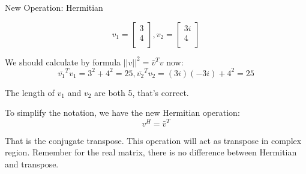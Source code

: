 \documentclass{beamer}
\begin{document}
\begin{frame}{New Operation: Hermitian}

\begin{equation*}
    v_1=\left[ \begin{array}{c}
        3\\
        4\\
    \end{array} \right] , v_2=\left[ \begin{array}{c}
        3i\\
        4\\
    \end{array} \right]
\end{equation*}

We should calculate by formula  $||v||^2=\bar{v}^Tv$ now:
\begin{equation*}
    {\bar{v_1}}^Tv_1=3^2+4^2=25, {\bar{v_2}}^Tv_2=\left( 3i \right) \left( -3i \right)+4^2=25
\end{equation*}

The length of $v_1$ and $v_2$ are both 5, that's correct.

\vspace{3pt}
To simplify the notation, we have the new Hermitian operation:
\begin{equation*}
    v^H={\bar{v}}^T
\end{equation*}

That is the conjugate transpose. This operation will act as transpose in complex region.
Remember for the real matrix, there is no difference between Hermitian and transpose.
\end{frame}
\end{document}
